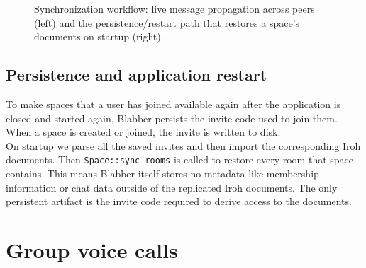 \documentclass{article} %
\begin{document}
\begin{figure}[H]
\caption{Synchronization workflow: live message propagation across peers (left) and the persistence/restart path that restores a space's documents on startup (right).}
\label{fig:sync_workflow}
\end{figure}


\subsection{Persistence and application restart}

To make spaces that a user has joined available again after the application is
closed and started again, Blabber persists the invite code used to join them.
When a space is created or joined, the invite is written to disk. \\
On startup we parse all the saved invites and then import the corresponding Iroh documents.
Then \texttt{Space::sync\_rooms} is called to restore every room that space
contains. This means Blabber itself stores no metadata like membership information or chat data outside of the replicated Iroh documents. The only persistent artifact is the invite code
required to derive access to the documents.

\section{Group voice calls}
\end{document}
